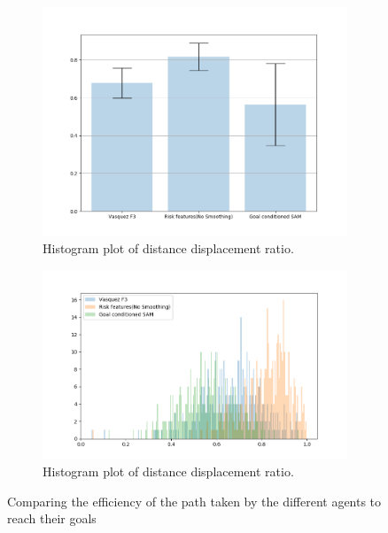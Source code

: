 \begin{figure}[htbp]
	\begin{subfigure}{\textwidth}
		\centering
		\includegraphics[width=.7\linewidth]{plots/inter_IRL/distance_displacement_ratio_barplots.png}
		\caption{Histogram plot of distance displacement ratio.}
		\label{fig:inter_IRL-distance_disp_ratio}
	\end{subfigure}
	\begin{subfigure}{\textwidth}
		\centering
		\includegraphics[width=.95\linewidth]{plots/inter_IRL/distance_displacement_ratio_histplot.png}
		\caption{Histogram plot of distance displacement ratio.}
		\label{fig:inter_IRL-distance_disp_ratio_histplot}
	\end{subfigure}
	\caption{Comparing the efficiency of the path taken by the different agents to reach their goals}
\end{figure}

